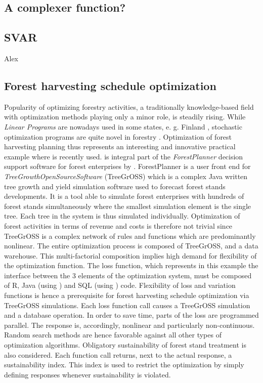 \subsection{A complexer function?}

\subsection{SVAR}
Alex
\subsection{Forest harvesting schedule optimization}
Popularity of optimizing forestry activities, a traditionally knowledge-based field with optimization methods playing only a minor role, is steadily rising. While \textit{Linear Programs} are nowadays used in some states, e. g. Finland \citep{redsven_2012}, stochastic optimization programs are quite novel in forestry \citep{kangas_2015}. Optimization of forest harvesting planning thus represents an interesting and innovative practical example where  is recently used.  is integral part of the \textit{ForestPlanner} decision support software for forest enterprises by \citet{hansen_2014}. ForestPlanner is a user front end for \textit{TreeGrowthOpenSourceSoftware} (TreeGrOSS) which is a complex Java written tree growth and yield simulation software used to forecast forest stands developments. It is a tool able to simulate forest enterprises with hundreds of forest stands simultaneously where the smallest simulation element is the single tree. Each tree in the system is thus simulated individually. Optimization of forest activities in terms of revenue and costs is therefore not trivial since TreeGrOSS is a complex network of rules and functions which are predominantly nonlinear. The entire optimization process is composed of TreeGrOSS,  and a data warehouse. This multi-factorial composition implies high demand for flexibility of the optimization function. The loss function, which represents in this example the interface between the 3 elements of the optimization system, must be composed of R, Java (using ) and SQL (using ) code. Flexibility of loss and variation functions is hence a prerequisite for forest harvesting schedule optimization via TreeGrOSS simulations. Each loss function call causes a TreeGrOSS simulation and a database operation. In order to save time, parts of the loss are programmed parallel. The response is, accordingly, nonlinear and particularly non-continuous. Random search methods are hence favorable against all other types of optimization algorithms. Obligatory sustainability of forest stand treatment is also considered. Each function call returns, next to the actual response, a sustainability index. This index is used to restrict the optimization by simply defining  responses whenever sustainability is violated.


